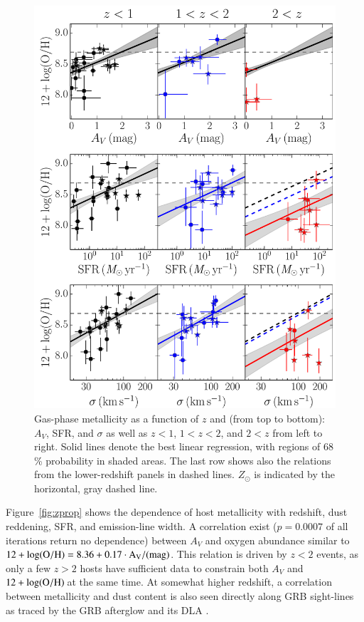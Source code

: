 \documentclass[traditabstract, longauth]{aa}
\newcommand{\oh}{12+\log(\rm{O/H})}
\begin{document}
\begin{figure}
\includegraphics[angle=0, width=0.99\columnwidth]{Figs/Z_z_z.pdf}
\caption{Gas-phase metallicity as a function of $z$ and (from top to bottom): $A_V$, SFR, and $\sigma$ as well as $z < 1$, $1<z<2$, and $2<z$ from left to right. Solid lines denote the best linear regression, with regions of 68\,\% probability in shaded areas. The last row shows also the relations from the lower-redshift panels in dashed lines. $Z_{\odot}$ is indicated by the horizontal, gray dashed line.}
\label{fig:zpropz}
\end{figure}

Figure~\ref{fig:zprop} shows the dependence of host metallicity with redshift, dust reddening, SFR, and emission-line width. A correlation exist ($p=0.0007$ of all iterations return no dependence) between $A_V$ and oxygen abundance similar to $\oh = 8.36 + 0.17 \cdot A_V/(\rm{mag})$. This relation is driven by $z<2$ events, as only a few $z>2$ hosts have sufficient data to constrain both $A_V$ and $\oh$\,at the same time. At somewhat higher redshift, a correlation between metallicity and dust content is also seen directly along GRB sight-lines as traced by the GRB afterglow and its DLA \citep[][]{2013A&A...560A..26Z}. 
\end{document}
